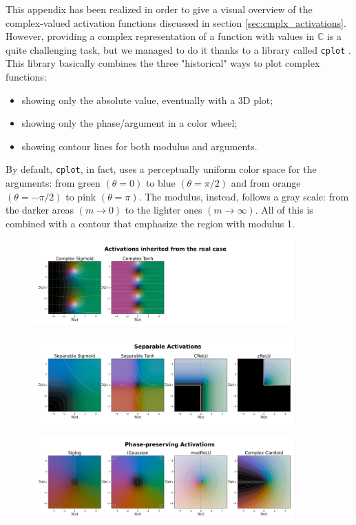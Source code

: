 \documentclass[../main.tex]{subfiles}
\begin{document}
This appendix has been realized in order to give a visual overview of the complex-valued activation functions discussed in section \ref{sec:cmplx_activations}.\\
However, providing a complex representation of a function with values in $\mathds{C}$ is a quite challenging task, but we managed to do it thanks to a library called \texttt{cplot} \cite{Schlomer_cplot_Plot_complex}.\\
This library basically combines the three "historical" ways to plot complex functions:
\begin{itemize}
	\item showing only the absolute value, eventually with a 3D plot;
	\item showing only the phase/argument in a color wheel;
	\item showing contour lines for both modulus and arguments.
\end{itemize}

By default, \texttt{cplot}, in fact, uses a perceptually uniform color space for the arguments: from green $(\theta=0)$ to blue $(\theta=\pi/2)$ and from orange $(\theta=-\pi/2)$ to pink $(\theta=\pi)$. The modulus, instead, follows a gray scale: from the darker areas $(m\to 0)$ to the lighter ones $(m\to\infty)$. All of this is combined with a contour that emphasize the region with modulus 1.\\

\begin{figure}[!h]
	\centering
	\includegraphics[width=0.9\textwidth]{pictures/cmplx_activations_1}
\end{figure}
\begin{figure}[!h]
	\centering
	\includegraphics[width=0.9\textwidth]{pictures/cmplx_activations_2}
\end{figure}
\begin{figure}[!t]
	\centering
	\includegraphics[width=0.9\textwidth]{pictures/cmplx_activations_3}
\end{figure}
\vspace*{3in}
\end{document}
